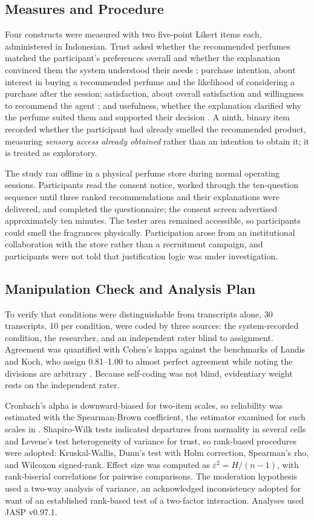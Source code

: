 \documentclass[conference]{IEEEtran}
\begin{document}
\subsection{Measures and Procedure}

Four constructs were measured with two five-point Likert items each, administered in
Indonesian. Trust asked whether the recommended perfumes matched the participant's
preferences overall and whether the explanation convinced them the system understood their
needs \cite{mcknight2002}; purchase intention, about interest in buying a recommended
perfume and the likelihood of considering a purchase after the session; satisfaction, about
overall satisfaction and willingness to recommend the agent \cite{pu2012}; and usefulness,
whether the explanation clarified why the perfume suited them and supported their decision
\cite{davis1989}. A ninth, binary item recorded whether the participant had already smelled
the recommended product, measuring \textit{sensory access already obtained} rather than an
intention to obtain it; it is treated as exploratory.

The study ran offline in a physical perfume store during normal operating sessions.
Participants read the consent notice, worked through the ten-question sequence until three
ranked recommendations and their explanations were delivered, and completed the
questionnaire; the consent screen advertised approximately ten minutes. The tester area
remained accessible, so participants could smell the fragrances physically. Participation
arose from an institutional collaboration with the store rather than a recruitment
campaign, and participants were not told that justification logic was under investigation.

\subsection{Manipulation Check and Analysis Plan}

To verify that conditions were distinguishable from transcripts alone, 30 transcripts, 10
per condition, were coded by three sources: the system-recorded condition, the researcher,
and an independent rater blind to assignment. Agreement was quantified with Cohen's kappa
against the benchmarks of Landis and Koch, who assign 0.81--1.00 to almost perfect
agreement while noting the divisions are arbitrary \cite{landis1977}. Because self-coding
was not blind, evidentiary weight rests on the independent rater.

Cronbach's alpha is downward-biased for two-item scales, so reliability was estimated with
the Spearman-Brown coefficient, the estimator examined for such scales in
\cite{eisinga2013}. Shapiro-Wilk tests indicated departures from normality in several cells
and Levene's test heterogeneity of variance for trust, so rank-based procedures were
adopted: Kruskal-Wallis, Dunn's test with Holm correction, Spearman's rho, and Wilcoxon
signed-rank. Effect size was computed as $\varepsilon^{2} = H/(n-1)$, with rank-biserial
correlations for pairwise comparisons. The moderation hypothesis used a two-way analysis of
variance, an acknowledged inconsistency adopted for want of an established rank-based test
of a two-factor interaction. Analyses used JASP v0.97.1.
\end{document}
